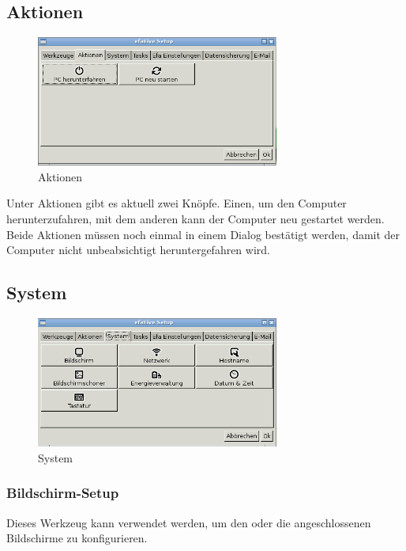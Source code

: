 \documentclass[a4paper,12pt,twoside]{article}
\begin{document}
\subsection{Aktionen}
\label{sct:aktionen}

\begin{figure}
    \centering
    \includegraphics[width=8cm]{screenshots/efalive_setup_actions.png}
    \caption{Aktionen}
    \label{fig:efalivesetup_actions}
\end{figure}

Unter Aktionen gibt es aktuell zwei Knöpfe. Einen, um den Computer
herunterzufahren, mit dem anderen kann der Computer neu gestartet
werden. Beide Aktionen müssen noch einmal in einem Dialog bestätigt
werden, damit der Computer nicht unbeabsichtigt heruntergefahren wird.


\subsection{System}
\label{sct:efalivesetup_system}

\begin{figure}
    \centering
    \includegraphics[width=8cm]{screenshots/efalive_setup_system.png}
    \caption{System}
    \label{fig:efalivesetup_system}
\end{figure}

\subsubsection{Bildschirm-Setup}
\label{sct:bildschirm}
Dieses Werkzeug kann verwendet werden, um den oder die angeschlossenen
Bildschirme zu konfigurieren.
\end{document}
